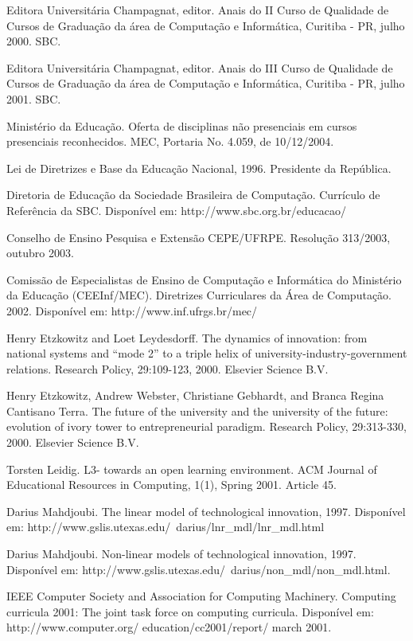 \documentclass[
	12pt,				%
	openright,			%
  oneside,     %
	a4paper,			%
	english,			%
	french,				%
	spanish,			%
	brazil				%
	]{abntex2}
\begin{document}
\noindent Editora Universitária Champagnat, editor. Anais do II Curso de Qualidade de Cursos de Graduação da área de Computação e Informática, Curitiba - PR, julho 2000. SBC.

\noindent Editora Universitária Champagnat, editor. Anais do III Curso de Qualidade de Cursos de Graduação da área de Computação e Informática, Curitiba - PR, julho 2001. SBC.

\noindent Ministério da Educação.  Oferta de disciplinas não presenciais em cursos presenciais reconhecidos.  MEC, Portaria No. 4.059, de 10/12/2004.

 
\noindent Lei de Diretrizes e Base da Educação Nacional, 1996. Presidente da República.

\noindent Diretoria de Educação da Sociedade Brasileira de Computação. Currículo de Referência da SBC. Disponível em: http://www.sbc.org.br/educacao/

\noindent Conselho de Ensino Pesquisa e Extensão CEPE/UFRPE. Resolução 313/2003, outubro 2003.

\noindent Comissão de Especialistas de Ensino de Computação e Informática do Ministério da Educação (CEEInf/MEC). Diretrizes Curriculares da Área de Computação. 2002.  Disponível em: http://www.inf.ufrgs.br/mec/

\noindent Henry Etzkowitz and Loet Leydesdorff. The dynamics of innovation: from national systems and ``mode 2'' to a triple helix of university-industry-government relations. Research Policy, 29:109-123, 2000. Elsevier Science B.V.

\noindent Henry Etzkowitz, Andrew Webster, Christiane Gebhardt, and Branca Regina Cantisano Terra. The future of the university and the university of the future: evolution of ivory tower to entrepreneurial paradigm. Research Policy, 29:313-330, 2000. Elsevier Science B.V.

\noindent Torsten Leidig. L3- towards an open learning environment. ACM Journal of Educational Resources in Computing, 1(1), Spring 2001. Article 45.

\noindent Darius Mahdjoubi. The linear model of technological innovation, 1997. Disponível em: http://www.gslis.utexas.edu/~darius/lnr\_mdl/lnr\_mdl.html

\noindent Darius Mahdjoubi. Non-linear models of technological innovation, 1997. Disponível em: http://www.gslis.utexas.edu/~darius/non\_mdl/non\_mdl.html.

\noindent IEEE Computer Society and Association for Computing Machinery. Computing curricula 2001: The joint task force on computing curricula.  Disponível em: http://www.computer.org/ education/cc2001/report/ march 2001.
%
%
\end{document}
